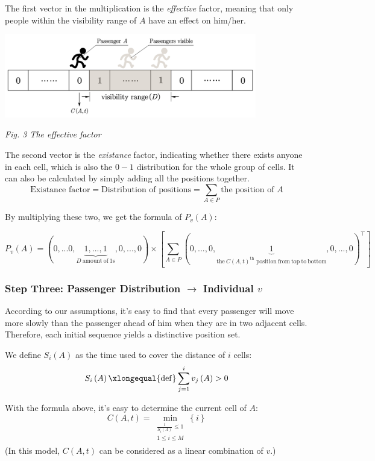 \documentclass{article}
\theoremstyle{definition}
\theoremstyle{remark}
\numberwithin{equation}{section}
\begin{document}
	The first vector in the multiplication is the \textit{effective} factor, meaning that only people within the visibility range of \(A\) have an effect on him/her.

	\begin{center}
	\includegraphics[width = 11cm]{effective factor.jpg}

	\small\textit{Fig. 3 The effective factor}
	\end{center}

	The second vector is the \textit{existance} factor, indicating whether there exists anyone in each cell, which is also the \(0-1\) distribution for the whole group of cells. It can also be calculated by simply adding all the positions together.
	\[\text{Existance factor} = \text{Distribution of positions} = \sum\limits_{A\in P} \text{the position of }A\]

	By multiplying these two, we get the formula of \(P_v\left( A \right)\):

	$$P_v\left( A \right) =\left( 0,...0,\underset{D\:\mathrm{amount}\:\mathrm{of}\:1\mathrm{s}}{\underbrace{1,...,1}},0,...,0 \right) \times \left[ \sum_{A\in P}{\left( 0,...,0,\underset{\mathrm{the}\:C\left( A,t \right) ^{\mathrm{th}}\,\,\mathrm{position}\:\mathrm{from}\:\mathrm{top}\:\mathrm{to}\:\mathrm{bottom}}{\underbrace{1}},0,...,0 \right) ^{\top}} \right] $$
	\subsubsection{Step Three: Passenger Distribution \(\to \) Individual \(v\)}
	According to our assumptions, it's easy to find that every passenger will move more slowly than the passenger ahead of him when they are in two adjacent cells. Therefore, each initial sequence yields a distinctive position set.

	We define \(S_i\left( A \right)\) as the time used to cover the distance of \(i\) cells:
	$$S_i\left( A \right) \xlongequal{\mathrm{def}}\sum_{j=1}^i{v_j\left( A \right)}>0$$

	With the formula above, it's easy to determine the current cell of \(A\):
	$$C\left( A,t \right) =\min_{\substack{\frac{t}{S_i\left( A \right)}\le 1\\1\le i\le M\\}} \left\{ i \right\} $$
	(In this model, $C(A,t)$ can be considered as a linear combination of $v$.)
\end{document}
